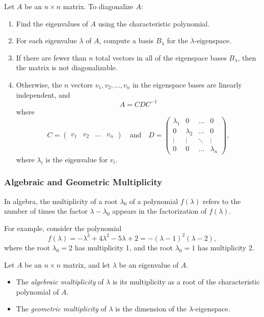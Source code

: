 \documentclass[a4paper,12pt]{article}
\begin{document}
\begin{tcolorbox}[title=Recipe: Diagonalization,colframe=blue!70!black, colback=blue!5!white]
Let \( A \) be an \( n \times n \) matrix. To diagonalize \( A \):

\begin{enumerate}
    \item Find the eigenvalues of \( A \) using the characteristic polynomial.
    \item For each eigenvalue \( \lambda \) of \( A \), compute a basis \( B_{\lambda} \) for the \( \lambda \)-eigenspace.
    \item If there are fewer than \( n \) total vectors in all of the eigenspace bases \( B_{\lambda} \), then the matrix is not diagonalizable.
    \item Otherwise, the \( n \) vectors \( v_1, v_2, \dots, v_n \) in the eigenspace bases are linearly independent, and 
    \[
    A = C D C^{-1}
    \]
    where 
    \[
    C = \begin{pmatrix} v_1 & v_2 & \dots & v_n \end{pmatrix}
    \quad \text{and} \quad
    D = \begin{pmatrix}
    \lambda_1 & 0 & \dots & 0 \\
    0 & \lambda_2 & \dots & 0 \\
    \vdots & \vdots & \ddots & \vdots \\
    0 & 0 & \dots & \lambda_n
    \end{pmatrix},
    \]
    where \( \lambda_i \) is the eigenvalue for \( v_i \).
\end{enumerate}

\end{tcolorbox}

\subsubsection{Algebraic and Geometric Multiplicity}
In algebra, the multiplicity of a root \( \lambda_0 \) of a polynomial \( f(\lambda) \) refers to the number of times the factor \( \lambda - \lambda_0 \) appears in the factorization of \( f(\lambda) \). 

For example, consider the polynomial
\[
f(\lambda) = -\lambda^3 + 4\lambda^2 - 5\lambda + 2 = -(\lambda - 1)^2 (\lambda - 2),
\]
where the root \( \lambda_0 = 2 \) has multiplicity 1, and the root \( \lambda_0 = 1 \) has multiplicity 2.
\begin{tcolorbox}[title=Definition,colframe=blue!70!black, colback=blue!5!white]

Let \( A \) be an \( n \times n \) matrix, and let \( \lambda \) be an eigenvalue of \( A \). 

\begin{itemize}
    \item The \textit{algebraic multiplicity} of \( \lambda \) is its multiplicity as a root of the characteristic polynomial of \( A \).
    \item The \textit{geometric multiplicity} of \( \lambda \) is the dimension of the \( \lambda \)-eigenspace.
\end{itemize}
\end{tcolorbox}
\end{document}
